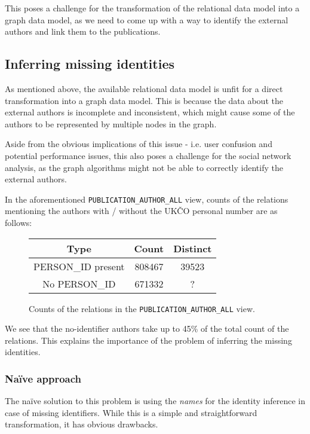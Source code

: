 This poses a challenge for the transformation of the relational data model into a graph data model, as we need to come up 
with a way to identify the external authors and link them to the publications.

\subsection{Inferring missing identities}

As mentioned above, the available relational data model is unfit for a direct transformation into a graph data model.
This is because the data about the external authors is incomplete and inconsistent, which might cause some of the authors
to be represented by multiple nodes in the graph.

Aside from the obvious implications of this issue - i.e. user confusion and potential performance issues,
this also poses a challenge for the social network analysis, as the graph algorithms might not be able 
to correctly identify the external authors.

In the aforementioned \texttt{PUBLICATION\_AUTHOR\_ALL} view, counts of the relations mentioning the authors with / without the UKČO personal number are as follows:

\begin{figure}[!ht]
    \captionsetup{width=.9\linewidth}
    \centering
    \begin{tabular}{|c|c|c|}
    \hline
        Type & Count & Distinct \\ \hline
        PERSON\_ID present & 808467 & 39523 \\ \hline
        No PERSON\_ID & 671332 & ? \\ \hline
    \end{tabular}
    \caption{Counts of the relations in the \texttt{PUBLICATION\_AUTHOR\_ALL} view.}
\end{figure}

We see that the no-identifier authors take up to 45\% of the total count of the relations.
This explains the importance of the problem of inferring the missing identities.

\subsubsection{Naïve approach}

The naïve solution to this problem is using the \textit{names} for the identity inference 
in case of missing identifiers.
While this is a simple and straightforward transformation, it has obvious drawbacks.

